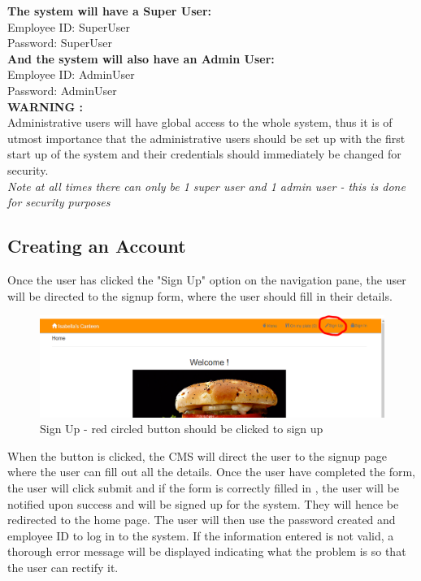 \documentclass[a4paper,12pt]{report}
\begin{document}
\textbf{The system will have a Super User:} \\
Employee ID: SuperUser \\
Password: SuperUser \\

\textbf{And the system will also have an Admin User:} \\
Employee ID: AdminUser \\
Password: AdminUser \\

\textbf{WARNING :} \\
Administrative users will have global access to the whole system, thus it is of utmost importance that the administrative users should be set up with the first start up of the system and their credentials should immediately be changed for security. \\ 

{\em* Note at all times there can only be 1 super user and 1 admin user - this is done for security purposes  } \\
 

\subsection{Creating an Account} 
Once the user has clicked the "Sign Up" option on the navigation pane, the user will be directed to the signup form, where the user should fill in their details. 

\begin{figure}[H]
  \centering
    \includegraphics[width=1.0\textwidth]{screenshots/signUp.PNG}
    \caption{Sign Up - red circled button should be clicked to sign up} 
\end{figure}

When the button is clicked, the CMS will direct the user to the signup page where the user can fill out all the details. Once the user have completed the form, the user will click submit and if the form is correctly filled in , the user will be notified upon success and will be signed up for the system. They will hence be redirected to the home page. The user will then use the password created and employee ID to log in to the system. If the information entered is not valid, a thorough error message will be displayed indicating what the problem is so that the user can rectify it.
\end{document}
